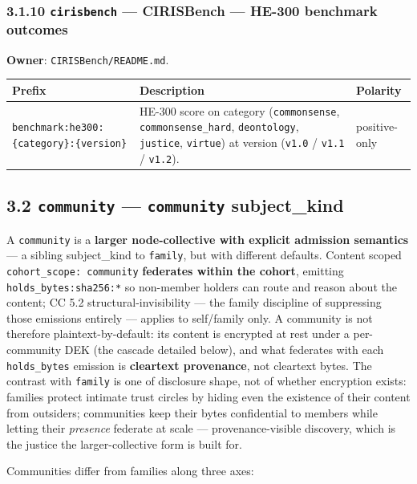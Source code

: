 \documentclass[11pt]{article}
\begin{document}
\subsubsection*{3.1.10 \texttt{cirisbench} — CIRISBench — HE-300 benchmark outcomes}


\textbf{Owner}: \texttt{CIRISBench/README.md}.


{\footnotesize
\begin{longtable}{|p{5.33cm}|p{5.33cm}|p{5.33cm}|}\hline
\textbf{Prefix} & \textbf{Description} & \textbf{Polarity} \\ \hline\endhead
\texttt{benchmark:he300:\{category\}:\{version\}} & HE-300 score on category (\texttt{commonsense}, \texttt{commonsense\_hard}, \texttt{deontology}, \texttt{justice}, \texttt{virtue}) at version (\texttt{v1.0} / \texttt{v1.1} / \texttt{v1.2}). & positive-only \\ \hline
\end{longtable}}


\subsection*{3.2 \texttt{community} — \texttt{community} subject\_kind}


A \texttt{community} is a \textbf{larger node-collective with explicit admission semantics} — a sibling subject\_kind to \texttt{family}, but with different defaults. Content scoped \texttt{cohort\_scope: community} \textbf{federates within the cohort}, emitting \texttt{holds\_bytes:sha256:*} so non-member holders can route and reason about the content; CC 5.2 structural-invisibility — the family discipline of suppressing those emissions entirely — applies to self/family only. A community is not therefore plaintext-by-default: its content is encrypted at rest under a per-community DEK (the cascade detailed below), and what federates with each \texttt{holds\_bytes} emission is \textbf{cleartext provenance}, not cleartext bytes. The contrast with \texttt{family} is one of disclosure shape, not of whether encryption exists: families protect intimate trust circles by hiding even the existence of their content from outsiders; communities keep their bytes confidential to members while letting their \textit{presence} federate at scale — provenance-visible discovery, which is the justice the larger-collective form is built for.


Communities differ from families along three axes:
\end{document}

